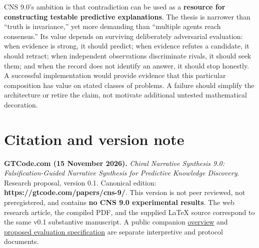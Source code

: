 \documentclass[11pt,a4paper]{article}
\begin{document}
CNS 9.0's ambition is that contradiction can be used as a
\textbf{resource for constructing testable predictive explanations}. The
thesis is narrower than ``truth is invariance,'' yet more demanding than
``multiple agents reach consensus.'' Its value depends on surviving
deliberately adversarial evaluation: when evidence is strong, it should
predict; when evidence refutes a candidate, it should retract; when
independent observations discriminate rivals, it should seek them; and
when the record does not identify an answer, it should stop honestly. A
successful implementation would provide evidence that this particular
composition has value on stated classes of problems. A failure should
simplify the architecture or retire the claim, not motivate additional
untested mathematical decoration.

\section{Citation and version note}\label{citation-and-version-note}

\textbf{GTCode.com (15 November 2026).} \emph{Chiral Narrative Synthesis
9.0: Falsification-Guided Narrative Synthesis for Predictive Knowledge
Discovery}. Research proposal, version 0.1. Canonical edition:
\textbf{https://gtcode.com/papers/cns-9/}. This version is not peer
reviewed, not preregistered, and contains \textbf{no CNS 9.0
experimental results}. The web research article, the compiled PDF, and
the supplied LaTeX source correspond to the same v0.1 substantive
manuscript. A public companion
\href{https://gtcode.com/guides/cns-9/overview/}{overview} and
\href{https://gtcode.com/guides/cns-9/evaluation/}{proposed evaluation
specification} are separate interpretive and protocol documents.



\end{document}
